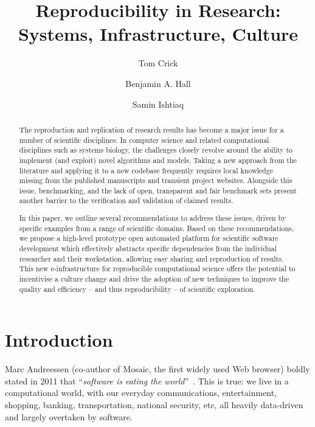 \documentclass[a4paper,11pt]{article}
\title{Reproducibility in Research: Systems, Infrastructure, Culture}
\author[1]{Tom Crick}
\author[2]{Benjamin A. Hall}
\author[3]{Samin Ishtiaq}
\affil[1]{Cardiff Metropolitan University, UK}
\affil[2]{University of Cambridge, UK}
\affil[3]{Microsoft Research Cambridge, UK}
\affil[1]{\protect\url{tcrick@cardiffmet.ac.uk}}
\affil[2]{\protect\url{bh418@mrc-cu.cam.ac.uk}}
\affil[3]{\protect\url{samin.ishtiaq@microsoft.com}}
\date{ }
\begin{document}
\maketitle



\begin{abstract}
The reproduction and replication of research results has become a
major issue for a number of scientific disciplines. In computer
science and related computational disciplines such as systems biology,
the challenges closely revolve around the ability to implement (and
exploit) novel algorithms and models. Taking a new approach from the
literature and applying it to a new codebase frequently requires local
knowledge missing from the published manuscripts and transient project
websites. Alongside this issue, benchmarking, and the lack of open,
transparent and fair benchmark sets present another barrier to the
verification and validation of claimed results.

In this paper, we outline several recommendations to address these
issues, driven by specific examples from a range of scientific
domains.  Based on these recommendations, we propose a high-level
prototype open automated platform for scientific software development
which effectively abstracts specific dependencies from the individual
researcher and their workstation, allowing easy sharing and
reproduction of results. This new e-infrastructure for reproducible
computational science offers the potential to incentivise a culture
change and drive the adoption of new techniques to improve the quality
and efficiency -- and thus reproducibility -- of scientific
exploration.
\end{abstract}

\section{Introduction}

Marc Andreessen (co-author of Mosaic, the first widely used Web
browser) boldly stated in 2011 that ``{\emph{software is eating the
world}}''~\cite{andreessen:2011}. This is true: we live in a
computational world, with our everyday communications, entertainment,
shopping, banking, transportation, national security, etc, all heavily
data-driven and largely overtaken by software.
\end{document}

